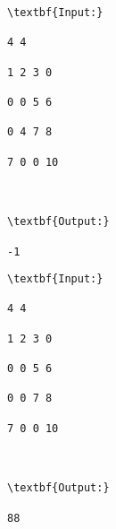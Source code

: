 \begin{verbatim}
\textbf{Input:}

4 4

1 2 3 0

0 0 5 6

0 4 7 8

7 0 0 10



\textbf{Output:}

-1

\end{verbatim}
\begin{verbatim}
\textbf{Input:}

4 4

1 2 3 0

0 0 5 6

0 0 7 8

7 0 0 10



\textbf{Output:}

88

\end{verbatim}